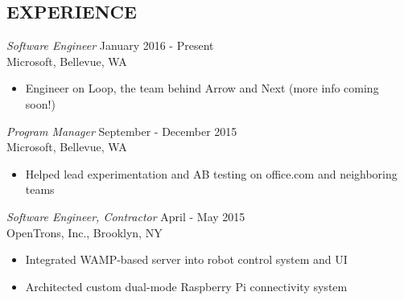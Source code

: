 \documentclass[margin,4pt]{res} %
\begin{document}
\address{virajosinha@gmail.com\\ vsinha.com \\github.com/vsinha}
\address{1451 20th Ave\\ Seattle, WA 98122\\(408) 505-1275}


\begin{resume}



 
\section{EXPERIENCE} 
	{\sl Software Engineer} \hfill January 2016 - Present\\
		Microsoft, Bellevue, WA
		\begin{itemize} \itemsep -2pt
		\item Engineer on Loop, the team behind Arrow and Next (more info coming soon!)
		\end{itemize}

	{\sl Program Manager} \hfill September - December 2015\\
		Microsoft, Bellevue, WA
		\begin{itemize} \itemsep -2pt
		\item Helped lead experimentation and AB testing on office.com and neighboring teams
		\end{itemize}

	{\sl Software Engineer, Contractor} \hfill April - May 2015\\
		OpenTrons, Inc., Brooklyn, NY
		\begin{itemize} \itemsep -2pt
		\item Integrated WAMP-based server into robot control system and UI
		\item Architected custom dual-mode Raspberry Pi connectivity system
		\end{itemize}


\end{resume}
\end{document}
